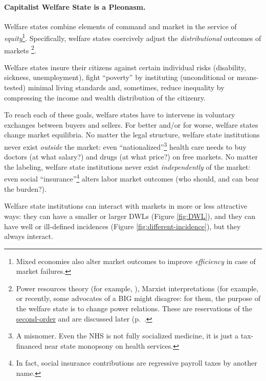 \paragraph{Capitalist Welfare State is a Pleonasm.}  \label{sec:interface}
Welfare states combine elements of  command and market in the service of \emph{equity}\footnote
	{Mixed economies also alter market outcomes to improve \emph{efficiency} in case of market failures.}.
Specifically, welfare states coercively adjust the \emph{distributional} outcomes of markets \footnote
	{Power resources theory (for example, \citealt{Korpi2003}), Marxist interpretations (for example, \cite{Offe1972} or recently, some advocates of a \gls{BIG} might disagree:
	for them, the purpose of the welfare state is to change power relations.
	These are reservations of the \hyperref[sec:who-dunnit]{second-order} and are discussed later (p.~\pageref{sec:who-dunnit}.}.

Welfare states insure their citizens against certain individual risks (disability, sickness, unemployment), fight ``poverty'' by instituting (unconditional or means-tested) minimal living standards and, sometimes, reduce inequality by compressing the income and wealth distribution of the citizenry.

To reach each of these goals, welfare states have to intervene in voluntary exchanges between buyers and sellers. For better and/or for worse, welfare states change market equilibria.
No matter the legal structure, welfare state institutions never exist \emph{outside} the market: even ``nationalized''\footnote
	{A misnomer.
	Even the \gls{NHS} is not fully socialized medicine, it is just a tax-financed near state monopsony on health services.}
health care needs to buy doctors (at what salary?) and drugs (at what price?) on free markets.
No matter the labeling, welfare state institutions never exist \emph{independently} of the market: even social ``insurance''\footnote
	{In fact, social insurance contributions are regressive payroll taxes by another name.}
alters labor market outcomes (who should, and can bear the burden?).

Welfare state institutions can interact with markets in more or less attractive ways: they can have a smaller or larger \glspl{DWL} (Figure \ref{fig:DWL}), and they can have well or ill-defined incidences (Figure \ref{fig:different-incidence}), but they always interact.%

